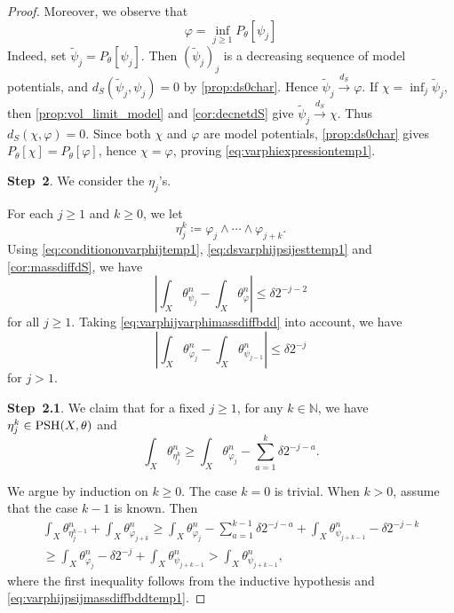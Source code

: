 \begin{proof}
    Moreover, we observe that
    \begin{equation}\label{eq:varphiexpressiontemp1}
        \varphi=\inf_{j\geq 1} P_{\theta}[\psi_j]
    \end{equation}
    Indeed, set $\tilde{\psi}_j=P_{\theta}[\psi_j]$. Then $(\tilde{\psi}_j)_j$ is a decreasing sequence of model potentials, and $d_S(\tilde{\psi}_j,\psi_j)=0$ by \cref{prop:ds0char}. Hence $\tilde{\psi}_j\xrightarrow{d_S}\varphi$. If $\chi=\inf_j\tilde{\psi}_j$, then \cref{prop:vol_limit_model} and \cref{cor:decnetdS} give $\tilde{\psi}_j\xrightarrow{d_S}\chi$. Thus $d_S(\chi,\varphi)=0$. Since both $\chi$ and $\varphi$ are model potentials, \cref{prop:ds0char} gives $P_{\theta}[\chi]=P_{\theta}[\varphi]$, hence $\chi=\varphi$, proving \eqref{eq:varphiexpressiontemp1}.

    \textbf{Step~2}. We consider the $\eta_j$'s.

    For each $j\geq 1$ and $k\geq 0$, we let
    \[
        \eta_j^k\coloneqq \varphi_j\land \cdots \land \varphi_{j+k}.
    \]
    Using \eqref{eq:conditiononvarphijtemp1}, \eqref{eq:dsvarphijpsijesttemp1} and \cref{cor:massdiffdS}, we have
    \[
        \left|\int_X\theta_{\psi_j}^n-\int_X \theta_{\varphi}^n \right|\leq \delta 2^{-j-2}
    \]
    for all $j\geq 1$. Taking \eqref{eq:varphijvarphimassdiffbdd} into account, we have
    \begin{equation}\label{eq:varphijpsijmassdiffbddtemp1}
     \left|\int_X\theta_{\varphi_j}^n-\int_X \theta_{\psi_{j-1}}^n \right|\leq \delta 2^{-j}
    \end{equation}
    for $j>1$.

    \textbf{Step~2.1}.
     We claim that for a fixed $j\geq 1$, for any $k\in \mathbb{N}$, we have
    $\eta_j^k\in \mathrm{PSH}(X,\theta)$ and
    \begin{equation}\label{eq:etajkmassbddbelowtemp1}
        \int_X \theta_{\eta_j^k}^n\geq \int_X \theta_{\varphi_j}^n-\sum_{a=1}^{k} \delta 2^{-j-a}.
    \end{equation}

    We argue by induction on $k\geq 0$.
    The case $k=0$ is trivial. When $k>0$, assume that the case $k-1$ is known. Then
    \[
        \begin{aligned}
            \int_X \theta_{\eta_j^{k-1}}^n+\int_X \theta_{\varphi_{j+k}}^n
            \geq \int_X \theta_{\varphi_j}^n-\sum_{a=1}^{k-1}\delta 2^{-j-a}+\int_X \theta_{\psi_{j+k-1}}^n-\delta 2^{-j-k}\\
            \geq \int_X \theta_{\varphi_j}^n-\delta 2^{-j}+\int_X \theta_{\psi_{j+k-1}}^n>\int_X \theta_{\psi_{j+k-1}}^n,
        \end{aligned}
    \]
    where the first inequality follows from the inductive hypothesis and \eqref{eq:varphijpsijmassdiffbddtemp1}.


\end{proof}
